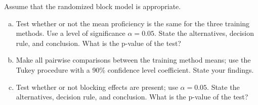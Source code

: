 \documentclass{article}
\begin{document}
Assume that the randomized block model is appropriate.
\begin{enumerate}[(a)]
	\item Test whether or not the mean proficiency is the same for the three training methods. Use a level of significance $\alpha = 0.05$. State the alternatives, decision rule, and conclusion. What is the p-value of the test?
	\item Make all pairwise comparisons between the training method means; use the Tukey procedure with a 90\% confidence level coefficient. State your findings.
	\item Test whether or not blocking effects are present; use \( \alpha = 0.05 \). State the alternatives, decision rule, and conclusion. What is the p-value of the test?
\end{enumerate}
\end{document}
